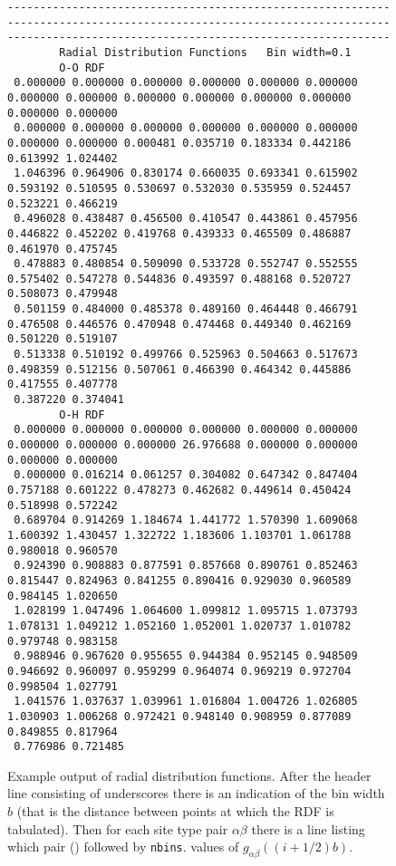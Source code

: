 \begin{figure}
\caption[Example output of radial distribution functions.]{Example
output of radial distribution functions. After the header line
consisting of underscores there is an indication of the bin width $b$
(that is the distance between points at which the RDF is tabulated).
Then for each site type pair $\alpha\beta$ there is a line listing
which pair () followed by {\tt nbins}.  values of
$g_{\alpha\beta}((i+1/2)b)$.  }
\label{fig:rdf-output}
\begin{tiny}
\begin{verbatim}
---------------------------------------------------------------------------------------------------------------------------------------------------------------------------------
        Radial Distribution Functions   Bin width=0.1
        O-O RDF
 0.000000 0.000000 0.000000 0.000000 0.000000 0.000000 0.000000 0.000000 0.000000 0.000000 0.000000 0.000000 0.000000 0.000000
 0.000000 0.000000 0.000000 0.000000 0.000000 0.000000 0.000000 0.000000 0.000481 0.035710 0.183334 0.442186 0.613992 1.024402
 1.046396 0.964906 0.830174 0.660035 0.693341 0.615902 0.593192 0.510595 0.530697 0.532030 0.535959 0.524457 0.523221 0.466219
 0.496028 0.438487 0.456500 0.410547 0.443861 0.457956 0.446822 0.452202 0.419768 0.439333 0.465509 0.486887 0.461970 0.475745
 0.478883 0.480854 0.509090 0.533728 0.552747 0.552555 0.575402 0.547278 0.544836 0.493597 0.488168 0.520727 0.508073 0.479948
 0.501159 0.484000 0.485378 0.489160 0.464448 0.466791 0.476508 0.446576 0.470948 0.474468 0.449340 0.462169 0.501220 0.519107
 0.513338 0.510192 0.499766 0.525963 0.504663 0.517673 0.498359 0.512156 0.507061 0.466390 0.464342 0.445886 0.417555 0.407778
 0.387220 0.374041
        O-H RDF
 0.000000 0.000000 0.000000 0.000000 0.000000 0.000000 0.000000 0.000000 0.000000 26.976688 0.000000 0.000000 0.000000 0.000000
 0.000000 0.016214 0.061257 0.304082 0.647342 0.847404 0.757188 0.601222 0.478273 0.462682 0.449614 0.450424 0.518998 0.572242
 0.689704 0.914269 1.184674 1.441772 1.570390 1.609068 1.600392 1.430457 1.322722 1.183606 1.103701 1.061788 0.980018 0.960570
 0.924390 0.908883 0.877591 0.857668 0.890761 0.852463 0.815447 0.824963 0.841255 0.890416 0.929030 0.960589 0.984145 1.020650
 1.028199 1.047496 1.064600 1.099812 1.095715 1.073793 1.078131 1.049212 1.052160 1.052001 1.020737 1.010782 0.979748 0.983158
 0.988946 0.967620 0.955655 0.944384 0.952145 0.948509 0.946692 0.960097 0.959299 0.964074 0.969219 0.972704 0.998504 1.027791
 1.041576 1.037637 1.039961 1.016804 1.004726 1.026805 1.030903 1.006268 0.972421 0.948140 0.908959 0.877089 0.849855 0.817964
 0.776986 0.721485

\end{verbatim}
\end{tiny}
\end{figure}

